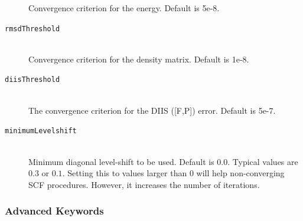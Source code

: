 \documentclass[bibliography=totocnumbered,a4paper,10pt,oneside]{scrbook}
\begin{document}
\begin{description}
   Convergence criterion for the energy. Default is 5e-8.
   \item [\texttt{rmsdThreshold}]\hfill \\
   Convergence criterion for the density matrix. Default is 1e-8.
  \item [\texttt{diisThreshold}]\hfill \\
   The convergence criterion for the DIIS ([F,P]) error. Default is 5e-7.
   \item [\texttt{minimumLevelshift}]\hfill \\
   Minimum diagonal level-shift to be used. Default is $0.0$. Typical values are $0.3$ or $0.1$. Setting this to values larger than $0$ will
   help non-converging SCF procedures. However, it increases the number of iterations.
\end{description}
\subsubsection{Advanced Keywords}
\end{document}
